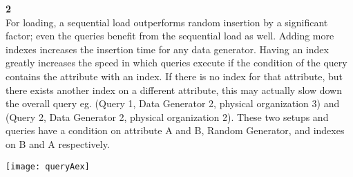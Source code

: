 \documentclass[12pt, letterpaper, fleqn]{article}
\begin{document}
  \textbf{2}\\
  For loading, a sequential load outperforms random insertion by a significant
  factor; even the queries benefit from the sequential load as well. Adding more
  indexes increases the insertion time for any data generator. Having an index
  greatly increases the speed in which queries execute if the condition of the
  query contains the attribute with an index. If there is no index for that
  attribute, but there exists another index on a different attribute, this may
  actually slow down the overall query eg. (Query 1, Data Generator 2, physical
  organization 3) and (Query 2, Data Generator 2, physical organization 2).
  These two setups and queries have a condition on attribute A and B, Random
  Generator, and indexes on B and A respectively.
  
  \texttt{[image: queryAex]}

 
\end{document}
